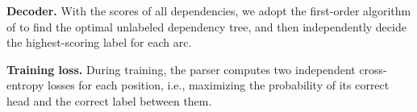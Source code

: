\textbf{Decoder. }
With the scores of all dependencies, 
we adopt the first-order algorithm of \citet{Eisner2000} %
to find the optimal unlabeled dependency tree, and then independently decide the highest-scoring label for each arc. 


\textbf{Training loss.} %
During training, the parser computes two independent cross-entropy losses for each position, i.e., maximizing the probability of its correct head and
the correct label between them. 




